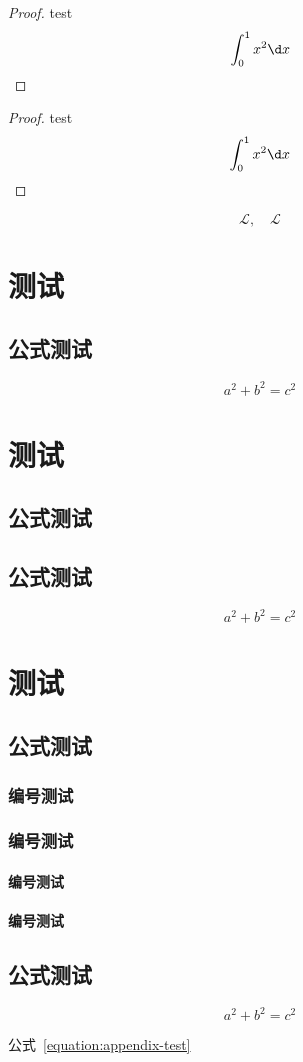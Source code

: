 \documentclass[type = doctor]{whu-thesis}
\begin{document}
\begin{proof}
  test
  \[
    \int_{0}^{1} x^2 \d x
  \]
\end{proof}

\begin{proof}
  test
  \[
    \int_{0}^{1} x^2 \d x \qedhere
  \]
\end{proof}

\[
  \mathcal{L},\quad \mathscr{L}
\]



\chapter{测试}

\section{公式测试}

\begin{equation}
  a^2 + b^2 = c^2
\end{equation}


% 


\appendix

\chapter{测试}

\section{公式测试}
\section{公式测试}

\begin{equation}
  a^2 + b^2 = c^2
\end{equation}

\chapter{测试}

\section{公式测试}
\subsection{编号测试}
\subsection{编号测试}
\subsubsection{编号测试}
\subsubsection{编号测试}

\section{公式测试}

\begin{equation}\label{equation:appendix-test}
  a^2 + b^2 = c^2
\end{equation}

公式~\eqref{equation:appendix-test}
\end{document}
